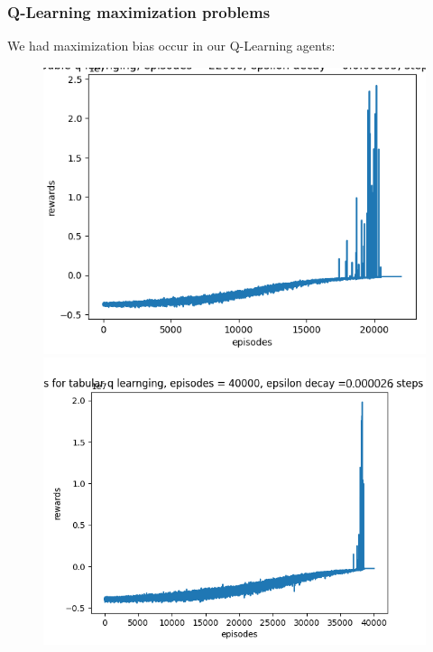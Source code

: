 \documentclass[twoside,11pt]{article}
\begin{document}
\subsubsection{Q-Learning maximization problems}
We had maximization bias occur in our Q-Learning agents:
\begin{figure}[H]
\includegraphics[scale=0.4]{Rewards_Double_Q_Learning_7}
\includegraphics[scale=0.4]{Rewards_Q_Learning}
\centering
\end{figure}
\end{document}
